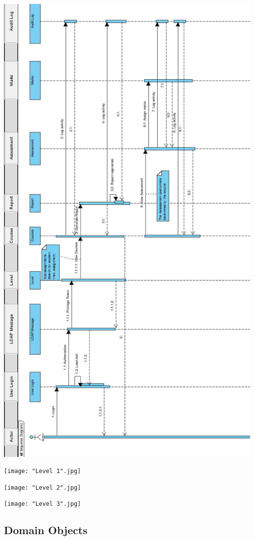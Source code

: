 \documentclass[10pt,a4paper]{article}
\begin{document}
\includegraphics[scale=0.75]{Sequence.png}

\texttt{[image: "Level 1".jpg]}

\texttt{[image: "Level 2".jpg]}

\texttt{[image: "Level 3".jpg]}
\subsection{Domain Objects}
\end{document}
